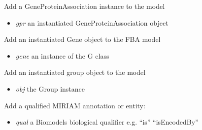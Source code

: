 \documentclass[a4paper,11pt,english]{sphinxmanual}
\begin{document}
\begin{fulllineitems}
\begin{fulllineitems}
\end{fulllineitems}


\begin{fulllineitems}
\label{modules_doc:cbmpy.CBModel.Model.addGPRAssociation}
Add a GeneProteinAssociation instance to the model
\begin{itemize}
\item {} 
\emph{gpr} an instantiated GeneProteinAssociation object

\end{itemize}

\end{fulllineitems}


\begin{fulllineitems}
\label{modules_doc:cbmpy.CBModel.Model.addGene}
Add an instantiated Gene object to the FBA model
\begin{itemize}
\item {} 
\emph{gene} an instance of the G class

\end{itemize}

\end{fulllineitems}


\begin{fulllineitems}
\label{modules_doc:cbmpy.CBModel.Model.addGroup}
Add an instantiated group object to the model
\begin{itemize}
\item {} 
\emph{obj} the Group instance

\end{itemize}

\end{fulllineitems}


\begin{fulllineitems}
\label{modules_doc:cbmpy.CBModel.Model.addMIRIAMannotation}
Add a qualified MIRIAM annotation or entity:
\begin{itemize}
\item {} 
\emph{qual} a Biomodels biological qualifier e.g. ``is'' ``isEncodedBy''


\end{itemize}
\end{fulllineitems}
\end{fulllineitems}
\end{document}
